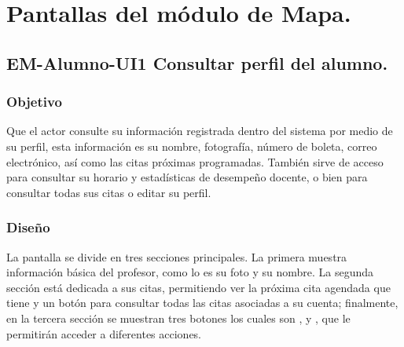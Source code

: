 



\section{Pantallas del módulo de Mapa.}

\subsection{EM-Alumno-UI1 Consultar perfil del alumno.}

\subsubsection{Objetivo}
	\noindent
	Que el actor consulte su información registrada dentro del sistema por medio de su perfil, esta información es su nombre, fotografía, número de boleta, correo electrónico, así como las citas próximas programadas. También sirve de acceso para consultar su horario y estadísticas de desempeño docente, o bien para consultar todas sus citas o editar su perfil.  

\subsubsection{Diseño}
	\noindent
	La pantalla se divide en tres secciones principales. La primera muestra información básica del profesor, como lo es su foto y su nombre. La segunda sección está dedicada a sus citas, permitiendo ver la próxima cita agendada que tiene y un botón para consultar todas las citas asociadas a su cuenta; finalmente, en la tercera sección se muestran tres botones los cuales son ,  y , que le permitirán acceder a diferentes acciones. 

\pagebreak
{}

